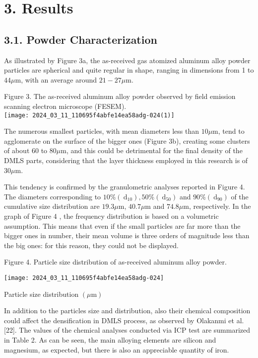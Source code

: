 \documentclass[10pt]{article}
\begin{document}
\section*{3. Results}
\subsection*{3.1. Powder Characterization}
As illustrated by Figure 3a, the as-received gas atomized aluminum alloy powder particles are spherical and quite regular in shape, ranging in dimensions from 1 to $44 \mu \mathrm{m}$, with an average around $21-27 \mu \mathrm{m}$.

Figure 3. The as-received aluminum alloy powder observed by field emission scanning electron microscope (FESEM).\\
\texttt{[image: 2024\_03\_11\_110695f4abfe14ea58adg-024(1)]}

The numerous smallest particles, with mean diameters less than $10 \mu \mathrm{m}$, tend to agglomerate on the surface of the bigger ones (Figure 3b), creating some clusters of about 60 to $80 \mu \mathrm{m}$, and this could be detrimental for the final density of the DMLS parts, considering that the layer thickness employed in this research is of $30 \mu \mathrm{m}$.

This tendency is confirmed by the granulometric analyses reported in Figure 4. The diameters corresponding to $10 \%\left(\mathrm{~d}_{10}\right), 50 \%\left(\mathrm{~d}_{50}\right)$ and $90 \%\left(\mathrm{~d}_{90}\right)$ of the cumulative size distribution are $19.3 \mu \mathrm{m}$, $40.7 \mu \mathrm{m}$ and $74.8 \mu \mathrm{m}$, respectively. In the graph of Figure 4 , the frequency distribution is based on a volumetric assumption. This means that even if the small particles are far more than the bigger ones in number, their mean volume is three orders of magnitude less than the big ones: for this reason, they could not be displayed.

Figure 4. Particle size distribution of as-received aluminum alloy powder.

\begin{center}
\texttt{[image: 2024\_03\_11\_110695f4abfe14ea58adg-024]}
\end{center}

Particle size distribution $(\mu \mathrm{m})$

In addition to the particles size and distribution, also their chemical composition could affect the densification in DMLS process, as observed by Olakanmi et al. [22]. The values of the chemical analyses conducted via ICP test are summarized in Table 2. As can be seen, the main alloying elements are silicon and magnesium, as expected, but there is also an appreciable quantity of iron.
\end{document}
